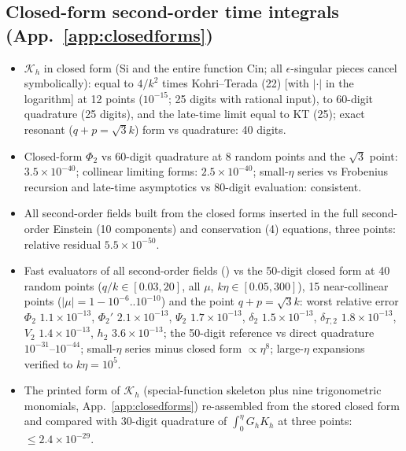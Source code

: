 \subsection*{Closed-form second-order time integrals (App.~\ref{app:closedforms})}
\begin{itemize}\itemsep1pt
\item[CF-1] $\mathcal K_h$ in closed form (Si and the entire function Cin; all $\epsilon$-singular pieces cancel symbolically): equal to $4/k^2$ times Kohri--Terada (22) [with $|\cdot|$ in the logarithm] at 12 points ($10^{-15}$; 25 digits with rational input), to 60-digit quadrature (25 digits), and the late-time limit equal to KT (25); exact resonant ($q+p=\sqrt3k$) form vs quadrature: 40 digits.
\item[CF-2] Closed-form $\Phi_2$ vs 60-digit quadrature at 8 random points and the $\sqrt3$ point: $3.5\times10^{-40}$; collinear limiting forms: $2.5\times10^{-40}$; small-$\eta$ series vs Frobenius recursion and late-time asymptotics vs 80-digit evaluation: consistent.
\item[CF-3] All second-order fields built from the closed forms inserted in the full second-order Einstein (10 components) and conservation (4) equations, three points: relative residual $5.5\times10^{-50}$.
\item[CF-5] Fast evaluators of all second-order fields () vs the 50-digit closed form at 40 random points ($q/k\in[0.03,20]$,
all $\mu$, $k\eta\in[0.05,300]$), 15 near-collinear points ($|\mu|=1-10^{-6}..10^{-10}$) and the point $q+p=\sqrt3k$: worst relative error $\Phi_2$ $1.1\times10^{-13}$,
$\Phi_2'$ $2.1\times10^{-13}$, $\Psi_2$ $1.7\times10^{-13}$, $\delta_2$ $1.5\times10^{-13}$, $\delta_{T,2}$ $1.8\times10^{-13}$, $V_2$ $1.4\times10^{-13}$, $h_2$ $3.6\times10^{-13}$; the 50-digit
reference vs direct quadrature $10^{-31}$--$10^{-44}$; small-$\eta$ series minus closed form $\propto\eta^8$; large-$\eta$ expansions verified to $k\eta=10^5$.
\item[CF-4] The printed form of $\mathcal K_h$ (special-function skeleton plus nine trigonometric monomials, App.~\ref{app:closedforms}) re-assembled from the stored closed form and compared with 30-digit quadrature of $\int_0^\eta G_hK_h$ at three points: $\le2.4\times10^{-29}$.
\end{itemize}

